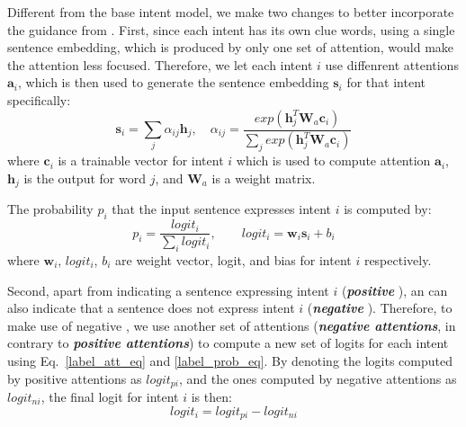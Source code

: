 Different from the base intent model, we make two changes to better incorporate the guidance from \RE.
First, since each intent has its own clue words, using a single sentence embedding, which is produced by only one set of attention, would make the attention less focused.
Therefore, we let each intent $i$ use diffenrent attentions $\textbf{a}_i$, which is then used to generate the sentence embedding $\textbf{s}_i$ for that intent specifically:
\begin{equation}
\textbf{s}_i = \sum_{j}{\alpha_{ij}\textbf{h}_j}, \quad
\alpha_{ij}=\frac{exp(\textbf{h}_j^T\textbf{W}_a\textbf{c}_i)}{\sum_{j}{exp(\textbf{h}_j^T\textbf{W}_a\textbf{c}_i)}}
\label{label_att_eq}
\end{equation}
where $\textbf{c}_i$ is a trainable vector for intent $i$ which is used to compute attention $\textbf{a}_i$, $\textbf{h}_j$ is the \BLSTM output for word $j$, and $\textbf{W}_a$ is a weight matrix.

The probability $p_i$ that the input sentence expresses intent $i$ is computed by:
\begin{equation}
p_i = \frac{logit_i}{\sum_{i}{logit_i}}, \quad\quad logit_i=\textbf{w}_i\textbf{s}_i + b_i
\label{label_prob_eq}
\end{equation}
where $\textbf{w}_i$, $logit_i$, $b_i$ are weight vector, logit, and bias for intent $i$ respectively.

Second, apart from indicating a sentence expressing intent $i$ (\textbf{\emph{positive \REs}}), an \RE can also indicate that a sentence does not express intent $i$ (\textbf{\emph{negative \REs}}). Therefore, to make use of negative \REs, we use another set of attentions (\textbf{\emph{negative attentions}}, in contrary to \textbf{\emph{positive attentions}}) to compute a new set of logits for each intent using Eq.~\ref{label_att_eq} and \ref{label_prob_eq}.
By denoting the logits computed by positive attentions as $logit_{pi}$, and the ones computed by negative attentions as $logit_{ni}$, the final logit for intent $i$ is then:
\begin{equation}
logit_i = logit_{pi} - logit_{ni}
\end{equation}

